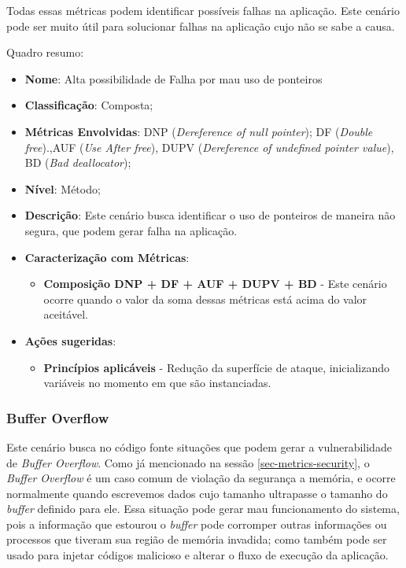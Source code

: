 Todas essas métricas podem identificar possíveis falhas na aplicação. Este cenário pode ser muito útil para solucionar falhas na aplicação cujo não se sabe a causa.

Quadro resumo:

\begin{itemize}
\item \textbf{Nome}: Alta possibilidade de Falha por mau uso de ponteiros
\item \textbf{Classificação}: Composta;
\item \textbf{Métricas Envolvidas}: DNP (\emph{Dereference of null pointer}); DF (\emph{Double free}).,AUF (\emph{Use After free}), DUPV (\emph{Dereference of undefined pointer value}), BD (\emph{Bad deallocator});
\item \textbf{Nível}: Método;
\item \textbf{Descrição}: Este cenário busca identificar o uso de ponteiros de maneira não segura, que podem gerar falha na aplicação.
\item \textbf{Caracterização com Métricas}: 
	\begin{itemize}
	\item \textbf{Composição DNP + DF + AUF + DUPV + BD} - Este cenário ocorre quando o valor da soma dessas métricas está acima do valor aceitável.
	\end{itemize}
\item \textbf{Ações sugeridas}: 
	\begin{itemize}
	\item \textbf{Princípios aplicáveis} - Redução da superfície de ataque, inicializando variáveis no momento em que são instanciadas.
	\end{itemize}
\end{itemize}


\subsubsection{Buffer Overflow}

Este cenário busca no código fonte situações que podem gerar a vulnerabilidade de \emph{Buffer Overflow}. Como já mencionado na sessão \ref{sec-metrics-security}, o \emph{Buffer Overflow} é um caso comum de violação da segurança a memória, e ocorre normalmente quando escrevemos dados cujo tamanho  ultrapasse o tamanho do \emph{buffer} definido para ele. Essa situação pode gerar  mau funcionamento do sistema, pois a informação que estourou o \emph{buffer} pode corromper outras informações ou processos que tiveram sua região de memória invadida; como também pode ser usado para injetar códigos malicioso e alterar o fluxo de execução da aplicação.

